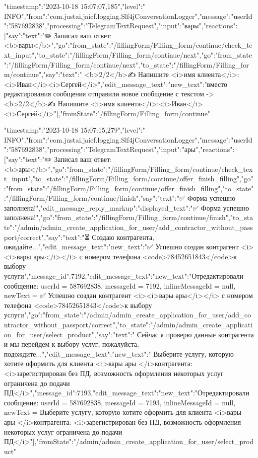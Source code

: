 \documentclass{article}
\begin{document}
\item{
{"timestamp":"2023-10-18 15:07:07,185","level":" INFO","from":"com.justai.jaicf.logging.Slf4jConversationLogger","message":{"userId":"587692838","processing":"TelegramTextRequest","input":"вары","reactions":[{"say":{"text":"✏️ Записал ваш ответ: <b>вары</b>"}},{"go":{"from_state":"/fillingForm/Filling_form/continue/check_text_input","to_state":"/fillingForm/Filling_form/continue/next"}},{"go":{"from_state":"/fillingForm/Filling_form/continue/next","to_state":"/fillingForm/Filling_form/continue"}},{"say":{"text":" <b>2/2</b>\n\n✍️ Напишите <i>имя клиента</i>\n{}:\n\n<i>Иван</i>\n<i>Сергей</i>"}},{"edit_message_text":{"new_text":"вместо редактирования сообщения отправили новое сообщение с текстом ->  <b>2/2</b>\n\n✍️ Напишите <i>имя клиента</i>\n{}:\n\n<i>Иван</i>\n<i>Сергей</i>"}}],"fromState":"/fillingForm/Filling_form/continue"}}
}

\item{
{"timestamp":"2023-10-18 15:07:15,279","level":" INFO","from":"com.justai.jaicf.logging.Slf4jConversationLogger","message":{"userId":"587692838","processing":"TelegramTextRequest","input":"ары","reactions":[{"say":{"text":"✏️ Записал ваш ответ: <b>ары</b>"}},{"go":{"from_state":"/fillingForm/Filling_form/continue/check_text_input","to_state":"/fillingForm/Filling_form/continue/offer_finish_filling"}},{"go":{"from_state":"/fillingForm/Filling_form/continue/offer_finish_filling","to_state":"/fillingForm/Filling_form/continue/finish"}},{"say":{"text":"✅ Форма успешно заполнена!"}},{"edit_message_reply_markup":{"displayed_text":"✅ Форма успешно заполнена!"}},{"go":{"from_state":"/fillingForm/Filling_form/continue/finish","to_state":"/admin/admin_create_application_for_user/add_contractor_without_passport/correct"}},{"say":{"text":"⏳ Создаю контрагента, ожидайте..."}},{"edit_message_text":{"new_text":"✅ Успешно создан контрагент <i><i>вары ары</i></i> с номером телефона <code>78452651843</code>\n{} к выбору услуги","message_id":7192}},{"edit_message_text":{"new_text":"Отредактировали сообщение: userId = 587692838, messageId = 7192, inlineMessageId = null, newText = ✅ Успешно создан контрагент <i><i>вары ары</i></i> с номером телефона <code>78452651843</code>\n{} к выбору услуги"}},{"go":{"from_state":"/admin/admin_create_application_for_user/add_contractor_without_passport/correct","to_state":"/admin/admin_create_application_for_user/select_product"}},{"say":{"text":" Сейчас я проверю данные контрагента и мы перейдем к выбору услуг, пожалуйста, подождите..."}},{"edit_message_text":{"new_text":" Выберите услугу, которую хотите оформить для клиента <i>вары ары </i>\n{} контрагента: <i>зарегистрирован без ПД, возможность оформления некоторых услуг ограничена до подачи ПД</i>","message_id":7193}},{"edit_message_text":{"new_text":"Отредактировали сообщение: userId = 587692838, messageId = 7193, inlineMessageId = null, newText =  Выберите услугу, которую хотите оформить для клиента <i>вары ары </i>\n{} контрагента: <i>зарегистрирован без ПД, возможность оформления некоторых услуг ограничена до подачи ПД</i>"}}],"fromState":"/admin/admin_create_application_for_user/select_product"}}
}
\end{document}
